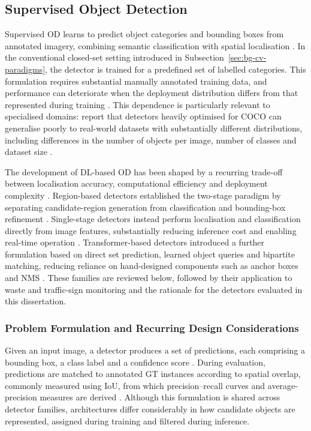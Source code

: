 \subsection{Supervised Object Detection}
\label{sec:bg-supervised-od}
Supervised \gls{OD} learns to predict object categories and bounding boxes from annotated imagery, combining semantic classification with spatial localisation \cite{zou2023objectdetection}. In the conventional closed-set setting introduced in Subsection~\ref{sec:bg-cv-paradigms}, the detector is trained for a predefined set of labelled categories. This formulation requires substantial manually annotated training data, and performance can deteriorate when the deployment distribution differs from that represented during training \cite{zou2023objectdetection}. This dependence is particularly relevant to specialised domains: \citeauthor{robinson2026rfdetrneuralarchitecturesearch} report that detectors heavily optimised for \gls{COCO} can generalise poorly to real-world datasets with substantially different distributions, including differences in the number of objects per image, number of classes and dataset size \cite{robinson2026rfdetrneuralarchitecturesearch}.

\newpage
\noindent The development of \gls{DL}-based \gls{OD} has been shaped by a recurring trade-off between localisation accuracy, computational efficiency and deployment complexity \cite{zou2023objectdetection}. Region-based detectors established the two-stage paradigm by separating candidate-region generation from classification and bounding-box refinement \cite{girshick2014rcnn,girshick2015fastrcnn,ren2015faster}. Single-stage detectors instead perform localisation and classification directly from image features, substantially reducing inference cost and enabling real-time operation \cite{redmon2016you,liu2016ssd}. Transformer-based detectors introduced a further formulation based on direct set prediction, learned object queries and bipartite matching, reducing reliance on hand-designed components such as anchor boxes and \gls{NMS} \cite{carion2020end}. These families are reviewed below, followed by their application to waste and traffic-sign monitoring and the rationale for the detectors evaluated in this dissertation.

\subsubsection{Problem Formulation and Recurring Design Considerations}
\label{sec:bg-od-formulation}
Given an input image, a detector produces a set of predictions, each comprising a bounding box, a class label and a confidence score \cite{zou2023objectdetection}. During evaluation, predictions are matched to annotated \gls{GT} instances according to spatial overlap, commonly measured using \gls{IoU}, from which precision--recall curves and average-precision measures are derived \cite{lin2014coco}. Although this formulation is shared across detector families, architectures differ considerably in how candidate objects are represented, assigned during training and filtered during inference.

